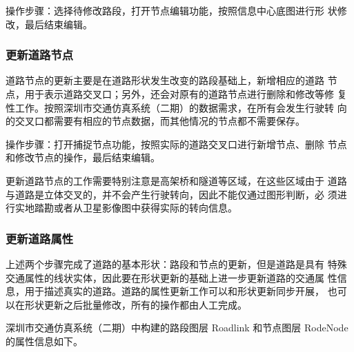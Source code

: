操作步骤：选择待修改路段，打开节点编辑功能，按照信息中心底图进行形
状修改，最后结束编辑。

\subsubsection{更新道路节点}
道路节点的更新主要是在道路形状发生改变的路段基础上，新增相应的道路
节点，用于表示道路交叉口；另外，还会对原有的道路节点进行删除和修改等修
复性工作。按照深圳市交通仿真系统（二期）的数据需求，在所有会发生行驶转
向的交叉口都需要有相应的节点数据，而其他情况的节点都不需要保存。

操作步骤：打开捕捉节点功能，按照实际的道路交叉口进行新增节点、删除
节点和修改节点的操作，最后结束编辑。

更新道路节点的工作需要特别注意是高架桥和隧道等区域，在这些区域由于
道路与道路是立体交叉的，并不会产生行驶转向，因此不能仅通过图形判断，必
须进行实地踏勘或者从卫星影像图中获得实际的转向信息。

\subsubsection{更新道路属性}
上述两个步骤完成了道路的基本形状：路段和节点的更新，但是道路是具有
特殊交通属性的线状实体，因此要在形状更新的基础上进一步更新道路的交通属
性信息，用于描述真实的道路。道路的属性更新工作可以和形状更新同步开展，
也可以在形状更新之后批量修改，所有的操作都由人工完成。

深圳市交通仿真系统（二期）中构建的路段图层 Roadlink 和节点图层
RodeNode 的属性信息如下。


